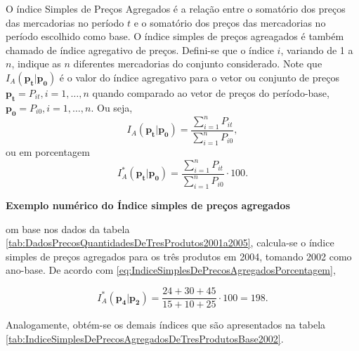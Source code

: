 \documentclass[
]{book}
\begin{document}
O índice Simples de Preços Agregados é a relação entre o somatório dos preços das mercadorias no período \(t\) e o somatório dos preços das mercadorias no período escolhido como base.
O índice simples de preços agreagados é também chamado de índice agregativo de preços.
Defini-se que o índice \(i\), variando de 1 a \(n\), indique as \(n\) diferentes mercadorias do conjunto considerado.
Note que \(I_A(\mathbf{p_t}|\mathbf{p_0})\) é o valor do índice agregativo para o vetor ou conjunto de preços \(\mathbf{p_t} = {P_{it},i=1,\ldots, n}\) quando comparado ao vetor de preços do período-base, \(\mathbf{p_0} = {P_{i0},i=1,\ldots, n}\). Ou seja,
\begin{equation}
  I_A(\mathbf{p_t}| \mathbf{p_0}) =
  \frac{\sum_{i=1}^{n}P_{it}}{\sum_{i=1}^{n}P_{i0}},
  \label{eq:IndiceSimplesDePrecosAgregados}
\end{equation}
ou em porcentagem
\begin{equation}
  I_A^*(\mathbf{p_t}| \mathbf{p_0}) =
  \frac{\sum_{i=1}^{n}P_{it}}{\sum_{i=1}^{n}P_{i0}} \cdot 100.
  \label{eq:IndiceSimplesDePrecosAgregadosPorcentagem}
\end{equation}

\textbf{Exemplo numérico do Índice simples de preços agregados}

om base nos dados da tabela \ref{tab:DadosPrecosQuantidadesDeTresProdutos2001a2005}, calcula-se o índice simples de preços agregados para os três produtos em 2004, tomando 2002 como ano-base. De acordo com \eqref{eq:IndiceSimplesDePrecosAgregadosPorcentagem},

\begin{equation}
  I_A^*(\mathbf{p_4}| \mathbf{p_2}) =
  \frac{24 + 30 + 45}{15 + 10 +25} \cdot 100 = 198.
\end{equation}

Analogamente, obtém-se os demais índices que são apresentados na tabela \ref{tab:IndiceSimplesDePrecosAgregadosDeTresProdutosBase2002}.
\end{document}
